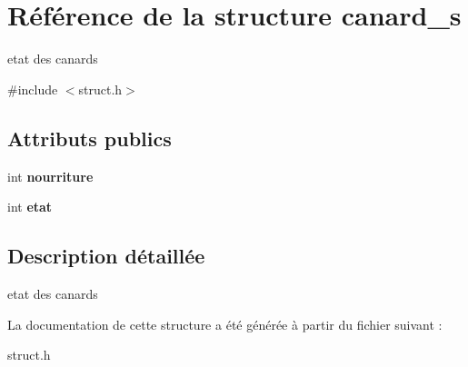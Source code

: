 \hypertarget{structcanard__s}{}\section{Référence de la structure canard\+\_\+s}
\label{structcanard__s}


etat des canards  




{\ttfamily \#include $<$struct.\+h$>$}

\subsection*{Attributs publics}
\begin{DoxyCompactItemize}
\item 
int {\bfseries nourriture}\hypertarget{structcanard__s_aedc71d760126c557287c662235d6993d}{}\label{structcanard__s_aedc71d760126c557287c662235d6993d}

\item 
int {\bfseries etat}\hypertarget{structcanard__s_aa43426e9cde18de872923e47f6ec558a}{}\label{structcanard__s_aa43426e9cde18de872923e47f6ec558a}

\end{DoxyCompactItemize}


\subsection{Description détaillée}
etat des canards 

La documentation de cette structure a été générée à partir du fichier suivant \+:\begin{DoxyCompactItemize}
\item 
struct.\+h\end{DoxyCompactItemize}
